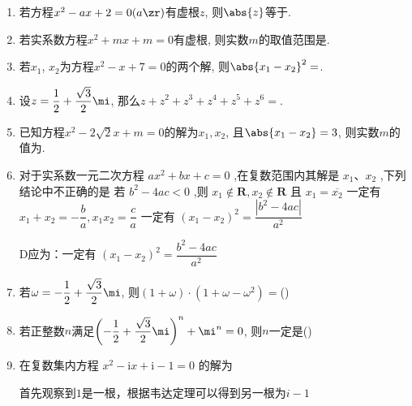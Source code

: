 \begin{enumerate}
    \item 若方程$x^2-ax+2=0(a\zr)$有虚根$z$, 则$\abs{z}$等于. 

    \item 若实系数方程$x^2+mx+m=0$有虚根, 则实数$m$的取值范围是. 

    \item 若$x_1$, $x_2$为方程$x^2-x+7=0$的两个解, 则$\abs{x_1-x_2}^2=$. 
    
    \item 设$z=\dfrac{1}{2}+\dfrac{\sqrt{3}}{2}\mi$, 那么$z+z^2+z^3+z^4+z^5+z^6=$. 
    
    \item 已知方程$x^2-2\sqrt{2}x+m=0$的解为$x_1,x_2$, 且$\abs{x_1-x_2}=3$, 则实数$m$的值为. 

    \item 对于实系数一元二次方程 $ a{x}^{2} + {bx} + c = 0 $ ,在复数范围内其解是 $ {x}_{1}\text{、}{x}_{2} $ ,下列结论中不正确的是
    {若 $ {b}^{2} - {4ac} < 0 $ ,则 $ {x}_{1} \notin  \mathbf{R},{x}_{2} \notin  \mathbf{R} $ 且 $ x_1 = \overline{{x}_{2}} $}
    {一定有 $ {x}_{1} + {x}_{2} =  - \dfrac{b}{a},{x}_{1}{x}_{2} = \dfrac{c}{a} $}
    {一定有 $ {\left( {x}_{1} - {x}_{2}\right) }^{2} = \dfrac{\left| {b}^{2} - 4ac\right| }{{a}^{2}} $}
    \begin{jieda}
        D应为：一定有 $ {\left( {x}_{1} - {x}_{2}\right) }^{2} = \dfrac{{b}^{2} - 4ac }{{a}^{2}} $
    \end{jieda}


    \item 若$\omega=-\dfrac{1}{2}+\dfrac{\sqrt{3}}{2}\mi$, 则$(1+\omega)\cdot(1+\omega-\omega^2)=$\dotfill()

    \item 若正整数$n$满足$\left(-\dfrac{1}{2}+\dfrac{\sqrt{3}}{2}\mi\right)^n+\mi^n=0$, 则$n$一定是\dotfill()

    \item 在复数集内方程 $ {x}^{2} - \mathrm{i}x + \mathrm{i} - 1 = 0 $ 的解为

    \begin{jieda}
        首先观察到$1$是一根，根据韦达定理可以得到另一根为$i-1$
    \end{jieda}


\end{enumerate}
